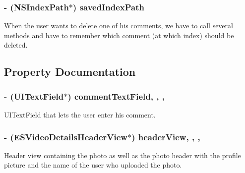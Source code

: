 \subsubsection[{saved\+Index\+Path}]{\setlength{\rightskip}{0pt plus 5cm}-\/ (N\+S\+Index\+Path$\ast$) saved\+Index\+Path\hspace{0.3cm}{\ttfamily [protected]}}\label{interface_e_s_video_detail_view_controller_af78401fcbda8010ec3894d40a97c2393}
When the user wants to delete one of his comments, we have to call several methods and have to remember which comment (at which index) should be deleted. 

\subsection{Property Documentation}
\hypertarget{interface_e_s_video_detail_view_controller_ae1fd28cd1174563626ee4f372973e26c}{}
\subsubsection[{comment\+Text\+Field}]{\setlength{\rightskip}{0pt plus 5cm}-\/ (U\+I\+Text\+Field$\ast$) comment\+Text\+Field\hspace{0.3cm}{\ttfamily [read]}, {\ttfamily [write]}, {\ttfamily [nonatomic]}, {\ttfamily [strong]}}\label{interface_e_s_video_detail_view_controller_ae1fd28cd1174563626ee4f372973e26c}
U\+I\+Text\+Field that lets the user enter his comment. \hypertarget{interface_e_s_video_detail_view_controller_a3553bcf1403fea69179d17e30f864333}{}
\subsubsection[{header\+View}]{\setlength{\rightskip}{0pt plus 5cm}-\/ ({\bf E\+S\+Video\+Details\+Header\+View}$\ast$) header\+View\hspace{0.3cm}{\ttfamily [read]}, {\ttfamily [write]}, {\ttfamily [nonatomic]}, {\ttfamily [strong]}}\label{interface_e_s_video_detail_view_controller_a3553bcf1403fea69179d17e30f864333}
Header view containing the photo as well as the photo header with the profile picture and the name of the user who uploaded the photo. \hypertarget{interface_e_s_video_detail_view_controller_a042ded94d23d82fd4e732c607c308d95}{}
